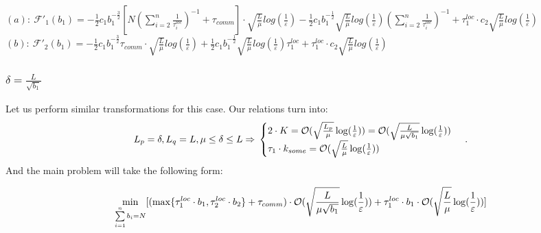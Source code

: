 \documentclass{article}
\begin{document}
$(a): ~\mathcal{F'}_1(b_1) = -\frac{1}{2}c_1 b_1^{-\frac{3}{2}}  [N (\sum\limits_{i = 2}^{n} \frac{1}{\tau_i^{loc}})^{-1} + \tau_{comm}]\cdot 
\sqrt{\frac{L}{\mu}}log (\frac{1}{\varepsilon})  - 
\frac{1}{2} c_1 b_1^{-\frac{1}{2}}   \sqrt{\frac{L}{\mu}}log (\frac{1}{\varepsilon})(\sum\limits_{i = 2}^{n} \frac{1}{\tau_i^{loc}})^{-1} +
\tau_1^{loc}\cdot c_2  \sqrt{\frac{L}{\mu}}log (\frac{1}{\varepsilon})$ \\
$(b): ~\mathcal{F'}_2(b_1) = -\frac{1}{2}c_1 b_1^{-\frac{3}{2}} \tau_{comm}\cdot \sqrt{\frac{L}{\mu}}log (\frac{1}{\varepsilon}) + \frac{1}{2} c_1 b_1^{-\frac{1}{2}}  \sqrt{\frac{L}{\mu}}log (\frac{1}{\varepsilon})\tau_1^{loc}   + \tau_1^{loc}\cdot c_2  \sqrt{\frac{L}{\mu}}log (\frac{1}{\varepsilon})$\\


\subsubsection{$\delta = \frac{L}{\sqrt{b_1}}$}
Let us perform similar transformations for this case. Our relations turn into:
\begin{equation}
    \notag
    L_p = \delta, L_q = L, \mu \leq \delta \leq L \Rightarrow 
    \\
    \notag
    \begin{cases}
      2\cdot K = \mathcal O(\sqrt{\frac{L_p}{\mu}}\log(\frac{1}{\varepsilon}))  = \mathcal O(\sqrt{\frac{L}{\mu \sqrt{b_1}}}\log(\frac{1}{\varepsilon}))\\
      \tau_1\cdot k_{some} = \mathcal O(\sqrt{\frac{L}{\mu}}\log(\frac{1}{\varepsilon}))
    \end{cases}\,.
\end{equation}
And the main problem will take the following form:

\begin{equation}
    \notag
    \underset{\sum\limits_{i = 1}^{n} b_i = N}{\min}[(\max\{\tau_1^{loc}\cdot b_1, \tau_2^{loc}\cdot b_2\} + \tau_{comm}) \cdot \mathcal O(\sqrt{\frac{L}{\mu \sqrt{b_1}}}\log(\frac{1}{\varepsilon})) + \tau_1^{loc}\cdot b_1 \cdot \mathcal O(\sqrt{\frac{L}{\mu}}\log(\frac{1}{\varepsilon}))]
\end{equation}
\end{document}
